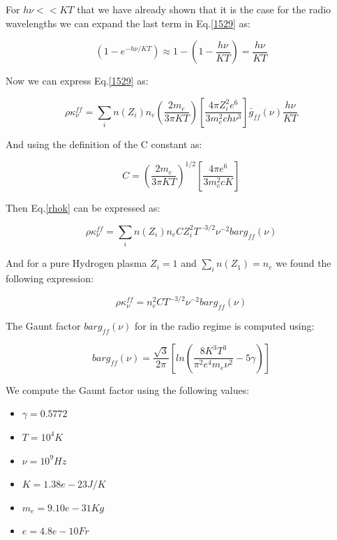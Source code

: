 \documentclass[12pt]{article}
\begin{document}
For  $h \nu << KT$ that we have already shown that it is the case for the radio
wavelengths we can expand the last term in Eq.\ref{1529} as:

\begin{equation}\label{aprox}
\left( 1 - e^{-h\nu / KT}\right) \approx 1 - \left(1 - \dfrac{h \nu}{KT} \right)
= \dfrac{h \nu}{KT}
\end{equation}  

Now we can express Eq.\ref{1529} as:

\begin{equation}\label{rhok}
\rho \kappa_{\nu}^{ff} = \sum_{i} n(Z_i) n_e \left( \dfrac{2m_e}{3\pi K T} \right)
\left[ \dfrac{4 \pi Z_i^2 e^6}{3 m_e^2 c h \nu^3} \right] \bar{g}_{ff}(\nu)\dfrac{h \nu}{KT}
\end{equation}

And using the definition of the C constant as:

\begin{equation}
C = \left( \dfrac{2m_e}{3\pi KT} \right)^{1/2} \left[ \dfrac{4\pi e^6}{3m_e^2 cK} \right]
\end{equation}

Then Eq.\ref{rhok} can be expressed as:

\begin{equation}
\rho \kappa_{\nu}^{ff} = \sum_{i} n(Z_i) n_e C Z_i^2 T^{-3/2} \nu^{-2} bar{g}_{ff}(\nu)
\end{equation}

And for a pure Hydrogen plasma $Z_i = 1$ and $\sum_{i}n(Z_1)=n_e$ we found the 
following expression: 

\begin{equation}
\rho \kappa_{\nu}^{ff} =  n_e^2 C T^{-3/2} \nu^{-2} bar{g}_{ff}(\nu)
\end{equation}

The Gaunt factor $bar{g}_{ff}(\nu)$ for in the radio regime is computed using:

\begin{equation}
bar{g}_{ff}(\nu) = \dfrac{\sqrt{3}}{2\pi} \left[
ln\left( \dfrac{8K^3T^3}{\pi^2 e^4 m_{e} \nu^2} 
- 5 \gamma \right) \right]
\end{equation}

We compute the Gaunt factor using the following values:

\begin{itemize}
\item $\gamma = 0.5772$
\item $T=10^4 K$ 
\item $\nu = 10^{9}Hz$
\item $K = 1.38e-23 J/K$
\item $m_e = 9.10e-31 Kg$
\item $e = 4.8e-10 Fr$

\end{itemize}
\end{document}
